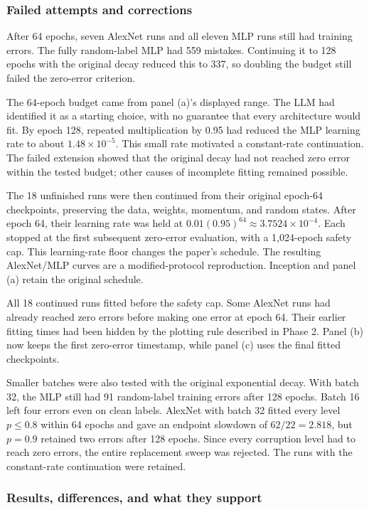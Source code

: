 \documentclass[11pt]{article}
\begin{document}
\subsubsection{Failed attempts and corrections}

After 64 epochs, seven AlexNet runs and all eleven MLP runs still had training errors. The fully random-label MLP had 559 mistakes. Continuing it to 128 epochs with the original decay reduced this to 337, so doubling the budget still failed the zero-error criterion.

The 64-epoch budget came from panel (a)'s displayed range. The LLM had identified it as a starting choice, with no guarantee that every architecture would fit. By epoch 128, repeated multiplication by 0.95 had reduced the MLP learning rate to about $1.48\times10^{-5}$. This small rate motivated a constant-rate continuation. The failed extension showed that the original decay had not reached zero error within the tested budget; other causes of incomplete fitting remained possible.

The 18 unfinished runs were then continued from their original epoch-64 checkpoints, preserving the data, weights, momentum, and random states. After epoch 64, their learning rate was held at $0.01(0.95)^{64}\approx3.7524\times10^{-4}$. Each stopped at the first subsequent zero-error evaluation, with a 1,024-epoch safety cap. This learning-rate floor changes the paper's schedule. The resulting AlexNet/MLP curves are a modified-protocol reproduction. Inception and panel (a) retain the original schedule.

All 18 continued runs fitted before the safety cap. Some AlexNet runs had already reached zero errors before making one error at epoch 64. Their earlier fitting times had been hidden by the plotting rule described in Phase 2. Panel (b) now keeps the first zero-error timestamp, while panel (c) uses the final fitted checkpoints.

Smaller batches were also tested with the original exponential decay. With batch 32, the MLP still had 91 random-label training errors after 128 epochs. Batch 16 left four errors even on clean labels. AlexNet with batch 32 fitted every level $p\leq0.8$ within 64 epochs and gave an endpoint slowdown of $62/22=2.818$, but $p=0.9$ retained two errors after 128 epochs. Since every corruption level had to reach zero errors, the entire replacement sweep was rejected. The runs with the constant-rate continuation were retained.

\subsubsection{Results, differences, and what they support}
\end{document}
